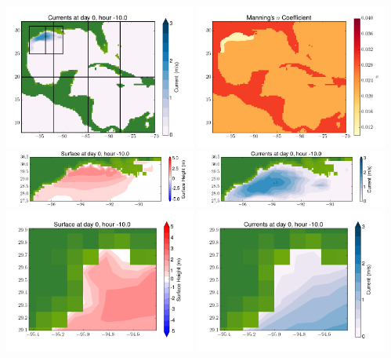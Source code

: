 \documentclass[11pt]{article}
\begin{document}
\includegraphics[width=0.475\textwidth]{frame0062fig2.png}
\vskip 10pt 
\includegraphics[width=0.475\textwidth]{frame0062fig3.png}
\includegraphics[width=0.475\textwidth]{frame0062fig4.png}
\vskip 10pt 
\includegraphics[width=0.475\textwidth]{frame0062fig5.png}
\includegraphics[width=0.475\textwidth]{frame0062fig6.png}
\vskip 10pt 
\includegraphics[width=0.475\textwidth]{frame0062fig7.png}
\end{document}
